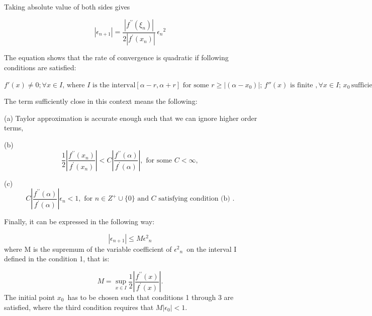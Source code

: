 \documentclass[10pt]{beamer}
\begin{document}
\begin{frame}[allowframebreaks]
Taking absolute value of both sides gives

\begin{equation*}
    \left| {\epsilon_{n+1}}\right| = \frac {\left| f^{\prime\prime} (\xi_n) \right| }{2 \left| f^\prime(x_n) \right|} \, {\epsilon_n}^2 \,
  \end{equation*}


The equation shows that the rate of convergence is quadratic if
following conditions are satisfied:


$f'(x)\ne0; \forall x\in I \text{, where }I \text{ is the interval
}[\alpha-r,\alpha+r]\text{ for some } r \ge
\left\vert(\alpha-x_0)\right\vert;\, f''(x) \text{ is finite },\forall
x\in I; \, x_0 \, \text{sufficiently close to the root}~ \alpha \,$


The term sufficiently close in this context means the following:

(a) Taylor approximation is accurate enough such that we can ignore higher order terms,

(b)
\begin{equation*}
\frac 1 {2}\left |{\frac {f^{\prime\prime} (x_n)}{f^\prime(x_n)}}\right |<C\left |{\frac {f^{\prime\prime} (\alpha)}{f^\prime(\alpha)}}\right |, \text{ for some } C<\infty,\,
\end{equation*}


(c)
\begin{equation*}
C \left |{\frac {f^{\prime\prime} (\alpha)}{f^\prime(\alpha)}}\right
|\epsilon_n<1, \text{ for }n\in Z^+ \cup \{0\} \text{ and }C \text{ satisfying condition (b) }.\,
\end{equation*}

Finally, it can be expressed in the following way:

\begin{equation*}
    \left | {\epsilon_{n+1}}\right | \le M{{\epsilon}^2}_n \,
  \end{equation*}
where M is the supremum of the variable coefficient of ${\epsilon^2}_n \,$ on the interval I\, defined in the condition 1, that is:

\begin{equation*}
M = \sup_{x \in I} \frac 1 {2}\left |{\frac {f^{\prime\prime} (x)}{f^\prime(x)}}\right |. \,
\end{equation*}
The initial point $x_0 \,$ has to be chosen such that conditions 1 through 3 are satisfied, where the third condition requires that $M\left |\epsilon_0 \right |<1.\,$
\end{frame}
\end{document}
